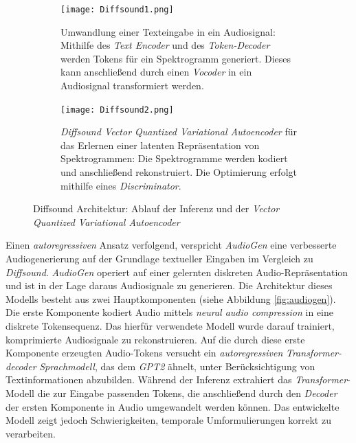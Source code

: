 \documentclass[
  a4paper,  %
  twoside,  %
  bibliography=totoc,
  headsepline,
  cleardoublepage=empty,
  parskip=half,
  draft=false
]{scrbook}
\begin{document}
\begin{figure}[h]
\centering
\begin{subfigure}{1.0\textwidth}
  \centering
  \texttt{[image: Diffsound1.png]}
  \caption[Diffsound Architektur]{Umwandlung einer Texteingabe in ein Audiosignal: Mithilfe des \emph{Text Encoder} und des \emph{Token-Decoder} werden Tokens für ein Spektrogramm generiert. Dieses kann anschließend durch einen \emph{Vocoder} in ein Audiosignal transformiert werden. \cite{yang_diffsound_2023}
}
  \label{fig:DiffsoundArchitecture}
\end{subfigure}

\vspace{1em} %

\begin{subfigure}{1.0\textwidth}
  \centering
  \texttt{[image: Diffsound2.png]}
  \caption[Diffsound VQ-VAE]{\emph{Diffsound Vector Quantized Variational Autoencoder} für das Erlernen einer latenten Repräsentation von Spektrogrammen: Die Spektrogramme werden kodiert und anschließend rekonstruiert. Die Optimierung erfolgt mithilfe eines \emph{Discriminator}. \cite{yang_diffsound_2023}}
  \label{fig:VQVAE}
\end{subfigure}
\caption[Diffsound Architektur]{Diffsound Architektur: Ablauf der Inferenz und der \emph{Vector Quantized Variational Autoencoder} \cite{yang_diffsound_2023}}
\label{fig:test}
\end{figure}

Einen \emph{autoregressiven} Ansatz verfolgend, verspricht \emph{AudioGen} \cite{kreuk_audiogen_2023} eine verbesserte Audiogenerierung auf der Grundlage textueller Eingaben im Vergleich zu \emph{Diffsound}. \emph{AudioGen} operiert auf einer gelernten diskreten Audio-Repräsentation und ist in der Lage daraus Audiosignale zu generieren. Die Architektur dieses Modells besteht aus zwei Hauptkomponenten (siehe Abbildung \ref{fig:audiogen}). Die erste Komponente kodiert Audio mittels \emph{neural audio compression} \cite{zeghidour_soundstream_2021} in eine diskrete Tokensequenz. Das hierfür verwendete Modell wurde darauf trainiert, komprimierte Audiosignale zu rekonstruieren. Auf die durch diese erste Komponente erzeugten Audio-Tokens versucht ein \emph{autoregressiven} \emph{Transformer-decoder} \emph{Sprachmodell}, das dem \emph{GPT2} \cite{alec_radford_jeff_wu_rewon_child_david_luan_dario_amodei_ilya_sutskever_language_2019} ähnelt, unter Berücksichtigung von Textinformationen abzubilden. Während der Inferenz extrahiert das \emph{Transformer}-Modell die zur Eingabe passenden Tokens, die anschließend durch den \emph{Decoder} der ersten Komponente in Audio umgewandelt werden können. Das entwickelte Modell zeigt jedoch Schwierigkeiten, temporale Umformulierungen korrekt zu verarbeiten. \cite{kreuk_audiogen_2023}
\end{document}
